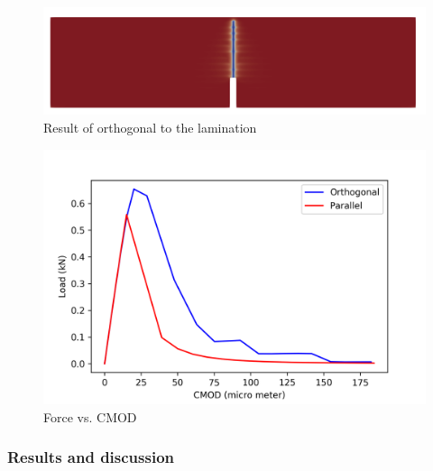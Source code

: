 \begin{figure}[!ht]
\centering
\includegraphics[width=1\textwidth]{figures/ME1_ext_2D_orth_result.png}
\caption{Result of orthogonal to the lamination}
\label{fig:ME1_ext_vpf_orth_result}
\end{figure}

\begin{figure}[!ht]
\centering
\includegraphics[width=1\textwidth]{figures/VPF_ME1_ex_NF_CMOD.png}
\caption{Force vs. CMOD}
\label{fig:ME1_ext_vpf_FvsCMOD}
\end{figure}

\subsubsection{Results and discussion}

